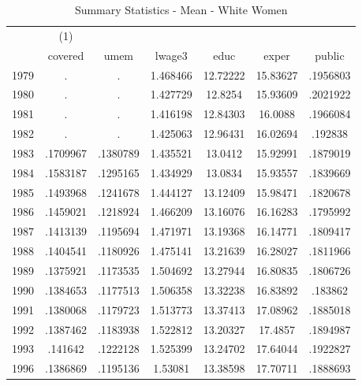 {
\def\sym#1{\ifmmode^{#1}\else\(^{#1}\)\fi}
\begin{longtable}{l*{1}{cccccc}}
\caption{Summary Statistics - Mean - White Women}\\
\hline\hline\endfirsthead\hline\endhead\hline\endfoot\endlastfoot
            &\multicolumn{1}{c}{(1)}&            &            &            &            &            \\
            &     covered&        umem&      lwage3&        educ&       exper&      public\\
\hline
1979        &           .&           .&    1.468466&    12.72222&    15.83627&    .1956803\\
1980        &           .&           .&    1.427729&     12.8254&    15.93609&    .2021922\\
1981        &           .&           .&    1.416198&    12.84303&     16.0088&    .1966084\\
1982        &           .&           .&    1.425063&    12.96431&    16.02694&     .192838\\
1983        &    .1709967&    .1380789&    1.435521&     13.0412&    15.92991&    .1879019\\
1984        &    .1583187&    .1295165&    1.434929&     13.0834&    15.93557&    .1839669\\
1985        &    .1493968&    .1241678&    1.444127&    13.12409&    15.98471&    .1820678\\
1986        &    .1459021&    .1218924&    1.466209&    13.16076&    16.16283&    .1795992\\
1987        &    .1413139&    .1195694&    1.471971&    13.19368&    16.14771&    .1809417\\
1988        &    .1404541&    .1180926&    1.475141&    13.21639&    16.28027&    .1811966\\
1989        &    .1375921&    .1173535&    1.504692&    13.27944&    16.80835&    .1806726\\
1990        &    .1384653&    .1177513&    1.506358&    13.32238&    16.83892&     .183862\\
1991        &    .1380068&    .1179723&    1.513773&    13.37413&    17.08962&    .1885018\\
1992        &    .1387462&    .1183938&    1.522812&    13.20327&     17.4857&    .1894987\\
1993        &     .141642&    .1222128&    1.525399&    13.24702&    17.64044&    .1922827\\
1996        &    .1386869&    .1195136&     1.53081&    13.38598&    17.70711&    .1888693\\

\end{longtable}}
